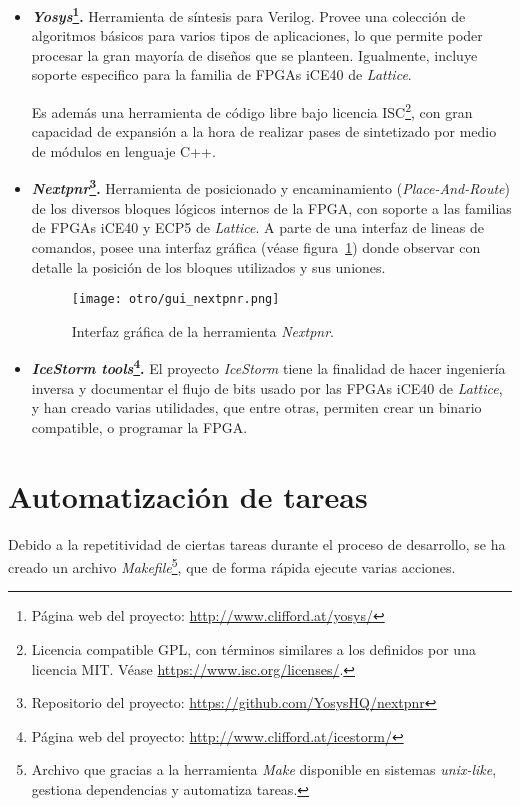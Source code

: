 \begin{itemize}
    \item \textbf{\emph{Yosys}\footnote{Página web del proyecto: \url{http://www.clifford.at/yosys/}}.} Herramienta de síntesis\cite{wolf2016yosys} para Verilog. Provee una colección de algoritmos básicos para varios tipos de aplicaciones, lo que permite poder procesar la gran mayoría de diseños que se planteen. Igualmente, incluye soporte especifico para la familia de FPGAs iCE40 de \emph{Lattice}.

    Es además una herramienta de código libre bajo licencia ISC\footnote{Licencia compatible GPL, con términos similares a los definidos por una licencia MIT. Véase \url{https://www.isc.org/licenses/}.}, con gran capacidad de expansión a la hora de realizar pases de sintetizado por medio de módulos en lenguaje C++.
    
    \item \textbf{\emph{Nextpnr}\footnote{Repositorio del proyecto: \url{https://github.com/YosysHQ/nextpnr}}.} Herramienta de posicionado y encaminamiento (\emph{Place-And-Route}) de los diversos bloques lógicos internos de la FPGA, con soporte a las familias de FPGAs iCE40 y ECP5 de \emph{Lattice}. A parte de una interfaz de lineas de comandos, posee una interfaz gráfica (véase figura~\ref{fig:gui_nextpnr}) donde observar con detalle la posición de los bloques utilizados y sus uniones.
    
    \begin{figure}[htb]
        \centering
        \texttt{[image: otro/gui\_nextpnr.png]}
        \caption{Interfaz gráfica de la herramienta \emph{Nextpnr}.}
        \label{fig:gui_nextpnr}
    \end{figure}

    \item \textbf{\emph{IceStorm tools}\footnote{Página web del proyecto: \url{http://www.clifford.at/icestorm/}}.} El proyecto \emph{IceStorm} tiene la finalidad de hacer ingeniería inversa y documentar el flujo de bits usado por las FPGAs iCE40 de \emph{Lattice}, y han creado varias utilidades, que entre otras, permiten crear un binario compatible, o programar la FPGA.   
\end{itemize}

\section{Automatización de tareas}
Debido a la repetitividad de ciertas tareas durante el proceso de desarrollo, se ha creado un archivo \emph{Makefile}\footnote{Archivo que gracias a la herramienta \emph{Make} disponible en sistemas \emph{unix-like}, gestiona dependencias y automatiza tareas.}, que de forma rápida ejecute varias acciones.

